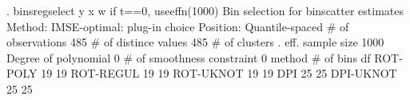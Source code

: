 . binsregselect y x w if t==0, useeffn(1000)
{\smallskip}
Bin selection for binscatter estimates
Method: IMSE-optimal: plug-in choice
Position: Quantile-spaced
{\smallskip}
          \# of observations {\VBAR}     485
       \# of distince values {\VBAR}     485
              \# of clusters {\VBAR}       .
           eff. sample size {\VBAR}    1000
       Degree of polynomial {\VBAR}       0
 \# of smoothness constraint {\VBAR}       0
{\smallskip}
    method    {\VBAR}   \# of bins {\VBAR}     df   
   ROT-POLY   {\VBAR}      19     {\VBAR}     19
   ROT-REGUL  {\VBAR}      19     {\VBAR}     19
   ROT-UKNOT  {\VBAR}      19     {\VBAR}     19
      DPI     {\VBAR}      25     {\VBAR}     25
   DPI-UKNOT  {\VBAR}      25     {\VBAR}     25
